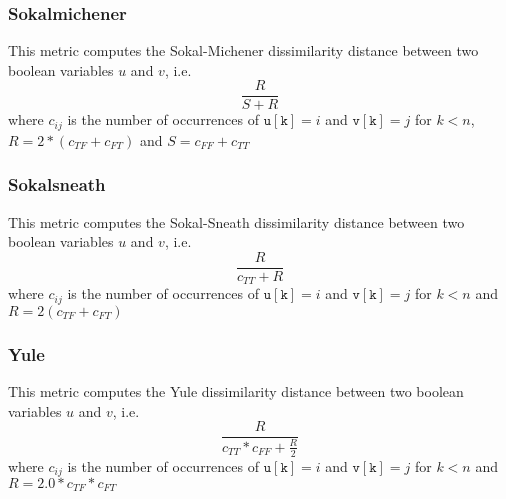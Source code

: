 
\subsubsection{Sokalmichener}
This metric computes the Sokal-Michener dissimilarity distance between two boolean variables $u$ and $v$, i.e.
\begin{equation}
  \frac{R}{S + R}
\end{equation}
where $c_{ij}$ is the number of occurrences of $\mathtt{u[k]} = i$ and $\mathtt{v[k]} = j$ for
$k < n$, $R = 2 * (c_{TF} + c_{FT})$ and $S = c_{FF} + c_{TT}$


\subsubsection{Sokalsneath}
This metric computes the Sokal-Sneath dissimilarity distance between two boolean variables $u$ and $v$, i.e.
\begin{equation}
  \frac{R}{c_{TT} + R}
\end{equation}
where $c_{ij}$ is the number of occurrences of $\mathtt{u[k]} = i$ and $\mathtt{v[k]} = j$
for $k < n$ and $R = 2(c_{TF} + c_{FT})$


\subsubsection{Yule}
This metric computes the Yule dissimilarity distance between two boolean variables $u$ and $v$, i.e.
\begin{equation}
  \frac{R}{c_{TT} * c_{FF} + \frac{R}{2}}
\end{equation}
where $c_{ij}$ is the number of occurrences of $\mathtt{u[k]} = i$ and $\mathtt{v[k]} = j$ for
$k < n$ and $R = 2.0 * c_{TF} * c_{FT}$



